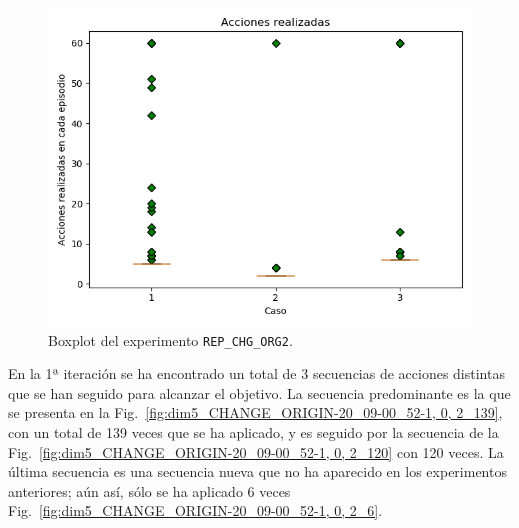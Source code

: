 \begin{figure}
    \centering
    \includegraphics[scale=0.4]{cap5_experimentacion/images/CHANGE_ORIGIN-20_09-00_52-1, 0, 2_boxplot.png}
    \caption{Boxplot del experimento \texttt{REP\_CHG\_ORG2}.}
    \label{fig:CHANGE_ORIGIN-20_09-00_52-1, 0, 2_boxplot}
\end{figure}

En la 1ª iteración se ha encontrado un total de 3 secuencias de acciones distintas que se han seguido para alcanzar el objetivo. La secuencia predominante es la que se presenta en la Fig.~\ref{fig:dim5_CHANGE_ORIGIN-20_09-00_52-1, 0, 2_139}, con un total de 139 veces que se ha aplicado, y es seguido por la secuencia de la Fig.~\ref{fig:dim5_CHANGE_ORIGIN-20_09-00_52-1, 0, 2_120} con 120 veces. La última secuencia es una secuencia nueva que no ha aparecido en los experimentos anteriores; aún así, sólo se ha aplicado 6 veces Fig.~\ref{fig:dim5_CHANGE_ORIGIN-20_09-00_52-1, 0, 2_6}. \\

